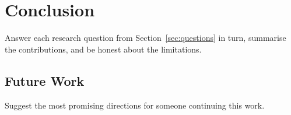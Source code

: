 \chapter{Conclusion}
\label{ch:conclusion}

Answer each research question from Section~\ref{sec:questions} in turn,
summarise the contributions, and be honest about the limitations.

\section{Future Work}
\label{sec:future}

Suggest the most promising directions for someone continuing this work.
